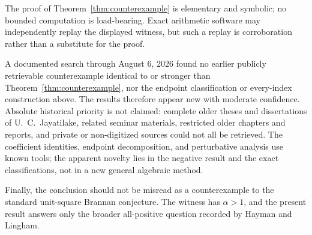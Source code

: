 \documentclass[a4paper]{amsart}
\theoremstyle{remark}
\begin{document}
The proof of Theorem~\ref{thm:counterexample} is elementary and symbolic; no bounded computation is load-bearing.  Exact arithmetic software may independently replay the displayed witness, but such a replay is corroboration rather than a substitute for the proof.

A documented search through August 6, 2026 found no earlier publicly retrievable counterexample identical to or stronger than Theorem~\ref{thm:counterexample}, nor the endpoint classification or every-index construction above.  The results therefore appear new with moderate confidence.  Absolute historical priority is not claimed: complete older theses and dissertations of U.~C.~Jayatilake, related seminar materials, restricted older chapters and reports, and private or non-digitized sources could not all be retrieved.  The coefficient identities, endpoint decomposition, and perturbative analysis use known tools; the apparent novelty lies in the negative result and the exact classifications, not in a new general algebraic method.

Finally, the conclusion should not be misread as a counterexample to the standard unit-square Brannan conjecture.  The witness has \(\alpha>1\), and the present result answers only the broader all-positive question recorded by Hayman and Lingham.



\end{document}
